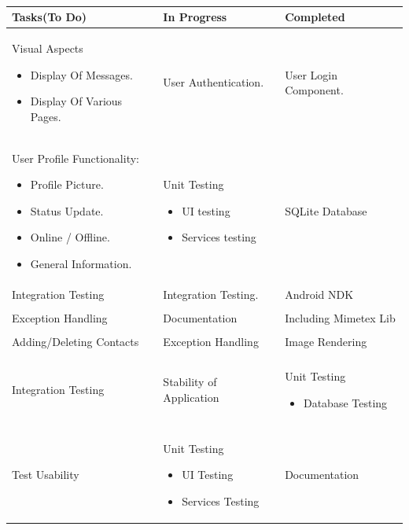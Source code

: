 \documentclass[29pt,a4paper]{moderncv}
\begin{document}
  		\\	\begin{tabular}{| p{2.5in} | p{2.5in} | p{2.5in} |}
				\hline
		    		\textbf{Tasks(To Do)} & \textbf{In Progress} & \textbf{Completed} \\ 
   				\hline
   				\hline
		    		Visual Aspects
		    		\begin{itemize}
			    		\item Display Of Messages.
			    		\item Display Of Various Pages.
		    		\end{itemize}
		    	 	& User Authentication. & User Login Component. \\ 
   				\hline
   				\hline
	   				User Profile Functionality:
	   				\begin{itemize}
	   					\item Profile Picture.
	   					\item Status Update.
	   					\item Online / Offline.
	   					\item General Information.
	   				\end{itemize}	
	   				& Unit Testing
	   				\begin{itemize}
	   					\item UI testing
		   				\item Services testing 
	   				\end {itemize}
	   				& SQLite Database\\
   				
				 Integration Testing & Integration Testing. & Android NDK\\
				
				\\ Exception Handling & Documentation & Including Mimetex Lib\\
				
				\\Adding/Deleting Contacts & Exception Handling & Image Rendering\\
				
				\\Integration Testing & Stability of Application & 
				Unit Testing
				\begin{itemize}
					\item Database Testing
				\end{itemize}
   				\\
   				
   				\\Test Usability &
   				Unit Testing 
   				\begin{itemize}
	   				\item UI Testing
	   				\item Services Testing 
   				\end{itemize} 
   				& Documentation\\
   				

\end{tabular}
\end{document}
